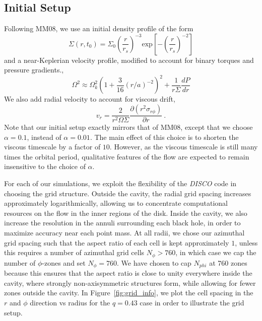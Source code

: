 \documentclass[apj]{emulateapj}
\begin{document}
           \subsection{Initial Setup}
           Following MM08, we use an initial density profile of the form
           \begin{equation}
             \Sigma(r,t_0) = \Sigma_0 \left(\frac{r}{r_s}\right)^{-3} \mbox{exp}\left[ - \left( \frac{r}{r_s}\right)^{-2}\right]
           \end{equation}
           and a near-Keplerian velocity profile, modified to account for binary torques and pressure gradients.,
           \begin{equation}
             \Omega^2 \approx \Omega_k^2\left(1+\frac{3}{16}(r/a)^{-2}\right)^2 + \frac{1}{r\Sigma}\frac{dP}{dr}
           \end{equation}
           We also add radial velocity to account for viscous drift,
           \begin{equation}
             v_r = \frac{2}{r^2 \Omega \Sigma} \frac{\partial(r^2 \sigma_{r \phi})}{\partial r} \ .
           \end{equation}
           Note that our initial setup exactly mirrors that of MM08, except that we choose $\alpha = 0.1$, instead of $\alpha = 0.01$. The main effect of this choice is to shorten the viscous timescale by a factor of $10$. However, as the viscous timescale is still many times the orbital period, qualitative features of the flow are expected to remain insensitive to the choice of $\alpha$. 

For each of our simulations, we exploit the flexibility of the {\it DISCO} code in choosing the grid structure. Outside the cavity, the radial grid spacing increases approximately logarithmically, allowing us to concentrate computational resources on the flow in the inner regions of the disk. Inside the cavity, we also increase the resolution in the annuli surrounding each black hole, in order to maximize accuracy near each point mass. At all radii, we chose our azimuthal grid spacing such that the aspect ratio of each cell is kept approximately $1$, unless this requires a number of azimuthal grid cells $N_{\phi} > 760$, in which case we cap the number of $\phi$-zones and set $N_{\phi}=760$. We have chosen to cap $N_{phi}$ at 760 zones because this ensures that the aspect ratio is close to unity everywhere inside the cavity, where strongly non-axisymmetric structures form, while allowing for fewer zones outside the cavity. In Figure~\ref{fig:grid_info}, we plot the cell spacing in the $r$ and $\phi$ direction vs radius for the $q=0.43$ case in order to illustrate the grid setup.
\end{document}
